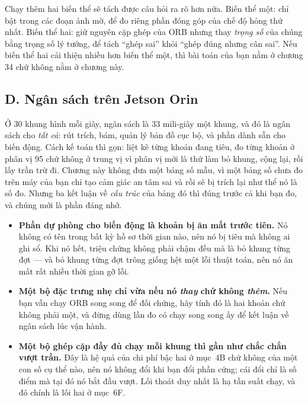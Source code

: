 \documentclass[../../deep_learning.tex]{subfiles}
\begin{document}
Chạy thêm hai biến thể sẽ tách được câu hỏi ra rõ hơn nữa. Biến thể một: chỉ bật  trong các đoạn ảnh mờ, để đo riêng phần đóng góp của chế độ hỏng thứ nhất. Biến thể hai: giữ nguyên cặp ghép của ORB nhưng thay \emph{trọng số} của chúng bằng trọng số lý tưởng, để tách ``ghép sai'' khỏi ``ghép đúng nhưng cân sai''. Nếu biến thể hai cải thiện nhiều hơn biến thể một, thì bài toán của bạn nằm ở chương 34 chứ không nằm ở chương này.


\subsection{D. Ngân sách trên Jetson Orin}
Ở 30 khung hình mỗi giây, ngân sách là 33 mili-giây một khung, và đó là ngân sách cho \emph{tất cả}: rút trích, bám, quản lý bản đồ cục bộ, và phần dành sẵn cho biến động. Cách kế toán thì gọn: liệt kê từng khoản đang tiêu, đo từng khoản ở phân vị 95 chứ không ở trung vị vì phân vị mới là thứ làm bỏ khung, cộng lại, rồi lấy trần trừ đi. Chương này không đưa một bảng số mẫu, vì một bảng số chưa đo trên máy của bạn chỉ tạo cảm giác an tâm sai và rồi sẽ bị trích lại như thể nó là số đo. Nhưng ba kết luận về \emph{cấu trúc} của bảng đó thì đúng trước cả khi bạn đo, và chúng mới là phần đáng nhớ.

\begin{itemize}
\item \textbf{Phần dự phòng cho biến động là khoản bị ăn mất trước tiên.} Nó không có tên trong bất kỳ hồ sơ thời gian nào, nên nó bị tiêu mà không ai ghi sổ. Khi nó hết, triệu chứng không phải chậm đều mà là bỏ khung từng đợt --- và bỏ khung từng đợt trông giống hệt một lỗi thuật toán, nên nó ăn mất rất nhiều thời gian gỡ lỗi.
\item \textbf{Một bộ đặc trưng nhẹ chỉ vừa nếu nó \emph{thay} chứ không \emph{thêm}.} Nếu bạn vẫn chạy ORB song song để đối chứng, hãy tính đó là hai khoản chứ không phải một, và đừng dùng lần đo có chạy song song ấy để kết luận về ngân sách lúc vận hành.
\item \textbf{Một bộ ghép cặp đầy đủ chạy mỗi khung thì gần như chắc chắn vượt trần.} Đây là hệ quả của chi phí bậc hai ở mục~4B chứ không của một con số cụ thể nào, nên nó không đổi khi bạn đổi phần cứng; cái đổi chỉ là số điểm mà tại đó nó bắt đầu vượt. Lối thoát duy nhất là hạ tần suất chạy, và đó chính là lối hai ở mục~6F.
\end{itemize}
\end{document}
